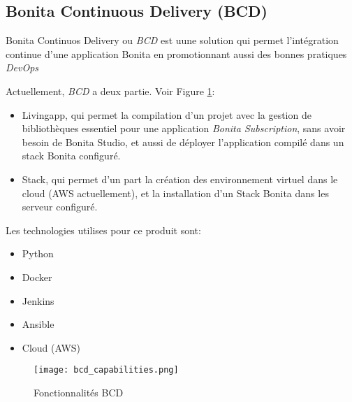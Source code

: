 \subsection{Bonita Continuous Delivery (BCD)} \label{bcd}
Bonita Continuos Delivery ou \textit{BCD} est uune solution qui permet l'intégration continue d'une application Bonita en promotionnant aussi des bonnes pratiques \emph{DevOps}

Actuellement, \textit{BCD} a deux partie. Voir Figure \ref{fig:bcd_cap}:
\begin{itemize}
  \item Livingapp, qui permet la compilation d'un projet avec la gestion de bibliothèques essentiel pour une application \textit{Bonita Subscription}, sans avoir besoin de Bonita Studio, et aussi de déployer l'application compilé dans un stack Bonita configuré.
  \item Stack, qui permet d'un part la création des environnement virtuel dans le cloud (AWS actuellement), et la installation d'un Stack Bonita dans les serveur configuré.
\end{itemize}

Les technologies utilises pour ce produit sont:
\begin{itemize}
  \item Python
  \item Docker
  \item Jenkins
  \item Ansible
  \item Cloud (AWS)
\end{itemize}

\begin{figure}[!ht]
\centering
\texttt{[image: bcd\_capabilities.png]}
\caption{Fonctionnalités BCD}
\label{fig:bcd_cap}
\end{figure}
